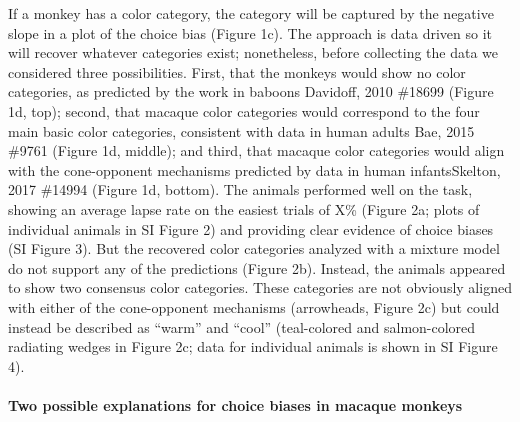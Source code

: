 If a monkey has a color category, the category will be captured by the negative slope in a plot of the choice bias (Figure 1c). The approach is data driven so it will recover whatever categories exist; nonetheless, before collecting the data we considered three possibilities. First, that the monkeys would show no color categories, as predicted by the work in baboons {Davidoff, 2010 \#18699} (Figure 1d, top); second, that macaque color categories would correspond to the four main basic color categories, consistent with data in human adults {Bae, 2015 \#9761} (Figure 1d, middle); and third, that macaque color categories would align with the cone-opponent mechanisms predicted by data in human infants{Skelton, 2017 \#14994} (Figure 1d, bottom). The animals performed well on the task, showing an average lapse rate on the easiest trials of X\% (Figure 2a; plots of individual animals in SI Figure 2) and providing clear evidence of choice biases (SI Figure 3). But the recovered color categories analyzed with a mixture model do not support any of the predictions (Figure 2b). Instead, the animals appeared to show two consensus color categories. These categories are not obviously aligned with either of the cone-opponent mechanisms (arrowheads, Figure 2c) but could instead be described as “warm” and “cool” (teal-colored and salmon-colored radiating wedges in Figure 2c; data for individual animals is shown in SI Figure 4).

\paragraph{Two possible explanations for choice biases in macaque monkeys}

